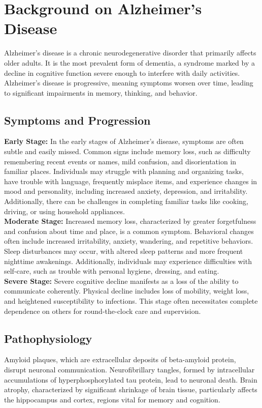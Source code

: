 \documentclass[a4paper,12pt]{report}
\begin{document}
    \section{Background on Alzheimer's Disease}
  Alzheimer's disease is a chronic neurodegenerative disorder that primarily affects older adults. It is the most prevalent form of dementia, a syndrome marked by a decline in cognitive function severe enough to interfere with daily activities. Alzheimer's disease is progressive, meaning symptoms worsen over time, leading to significant impairments in memory, thinking, and behavior.
    
    \subsection{Symptoms and Progression}
    \textbf{Early Stage:}
In the early stages of Alzheimer's disease, symptoms are often subtle and easily missed. Common signs include memory loss, such as difficulty remembering recent events or names, mild confusion, and disorientation in familiar places. Individuals may struggle with planning and organizing tasks, have trouble with language, frequently misplace items, and experience changes in mood and personality, including increased anxiety, depression, and irritability. Additionally, there can be challenges in completing familiar tasks like cooking, driving, or using household appliances.\\
{}
\newline\textbf{Moderate Stage:}
Increased memory loss, characterized by greater forgetfulness and confusion about time and place, is a common symptom. Behavioral changes often include increased irritability, anxiety, wandering, and repetitive behaviors. Sleep disturbances may occur, with altered sleep patterns and more frequent nighttime awakenings. Additionally, individuals may experience difficulties with self-care, such as trouble with personal hygiene, dressing, and eating.\\
{}
\newline\textbf{Severe Stage:}
Severe cognitive decline manifests as a loss of the ability to communicate coherently. Physical decline includes loss of mobility, weight loss, and heightened susceptibility to infections. This stage often necessitates complete dependence on others for round-the-clock care and supervision.

    \subsection{Pathophysiology}
Amyloid plaques, which are extracellular deposits of beta-amyloid protein, disrupt neuronal communication. Neurofibrillary tangles, formed by intracellular accumulations of hyperphosphorylated tau protein, lead to neuronal death. Brain atrophy, characterized by significant shrinkage of brain tissue, particularly affects the hippocampus and cortex, regions vital for memory and cognition.
  
\end{document}
